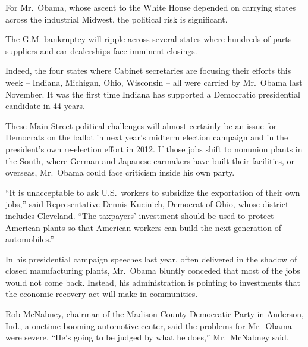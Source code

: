 \documentclass[12pt,a4paper,onecolumn]{article}
\begin{document}
For Mr.~Obama, whose ascent to the White House depended on carrying states across the industrial
Midwest, the political risk is significant.

The G.M. bankruptcy will ripple across several states where hundreds of parts suppliers and car
dealerships face imminent closings.

Indeed, the four states where Cabinet secretaries are focusing their efforts this week -- Indiana,
Michigan, Ohio, Wisconsin -- all were carried by Mr.~Obama last November. It was the first time
Indiana has supported a Democratic presidential candidate in 44 years.

These Main Street political challenges will almost certainly be an issue for Democrats on the ballot
in next year's midterm election campaign and in the president's own re-election effort in 2012. If
those jobs shift to nonunion plants in the South, where German and Japanese carmakers have built
their facilities, or overseas, Mr.~Obama could face criticism inside his own party.

``It is unacceptable to ask U.S.~workers to subsidize the exportation of their own jobs,'' said
Representative Dennis Kucinich, Democrat of Ohio, whose district includes Cleveland. ``The
taxpayers' investment should be used to protect American plants so that American workers can build
the next generation of automobiles.''

In his presidential campaign speeches last year, often delivered in the shadow of closed
manufacturing plants, Mr.~Obama bluntly conceded that most of the jobs would not come back. Instead,
his administration is pointing to investments that the economic recovery act will make in
communities.

Rob McNabney, chairman of the Madison County Democratic Party in Anderson, Ind., a onetime booming
automotive center, said the problems for Mr.~Obama were severe. ``He's going to be judged by what he
does,'' Mr.~McNabney said.
\end{document}
